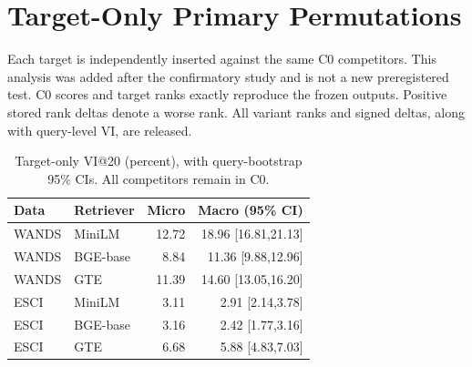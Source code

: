 \section{Target-Only Primary Permutations}
Each target is independently inserted against the same C0 competitors. This analysis was added after the confirmatory study and is not a new preregistered test. C0 scores and target ranks exactly reproduce the frozen outputs. Positive stored rank deltas denote a worse rank. All variant ranks and signed deltas, along with query-level VI, are released.
\begin{table}[H]
\caption{Target-only VI@20 (percent), with query-bootstrap 95\% CIs. All competitors remain in C0.}
\label{tab:targetonly}
\centering\small
\begin{tabular}{llrr}
\toprule Data & Retriever & Micro & Macro (95\% CI) \\
\midrule
WANDS & MiniLM & 12.72 & 18.96 [16.81,21.13] \\
WANDS & BGE-base & 8.84 & 11.36 [9.88,12.96] \\
WANDS & GTE & 11.39 & 14.60 [13.05,16.20] \\
ESCI & MiniLM & 3.11 & 2.91 [2.14,3.78] \\
ESCI & BGE-base & 3.16 & 2.42 [1.77,3.16] \\
ESCI & GTE & 6.68 & 5.88 [4.83,7.03] \\
\bottomrule\end{tabular}
\end{table}
